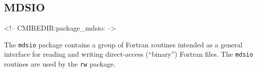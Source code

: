 

\subsection{MDSIO}
\label{sec:mdsio}
\label{sec:pkg:mdsio}
\begin{rawhtml}
<!-- CMIREDIR:package_mdsio: -->
\end{rawhtml}

The \texttt{mdsio} package contains a group of Fortran routines
intended as a general interface for reading and writing direct-access
(``binary'') Fortran files.  The \texttt{mdsio} routines are used by
the \texttt{rw} package.

